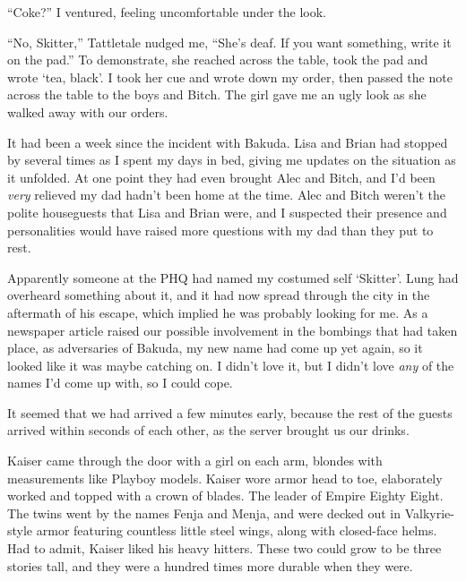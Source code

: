 ``Coke?'' I ventured, feeling uncomfortable under the look.



``No, Skitter,'' Tattletale nudged me, ``She's deaf.  If you want something, write it on the pad.''  To demonstrate, she reached across the table, took the pad and wrote `tea, black'.  I took her cue and wrote down my order, then passed the note across the table to the boys and Bitch.  The girl gave me an ugly look as she walked away with our orders.



It had been a week since the incident with Bakuda.  Lisa and Brian had stopped by several times as I spent my days in bed, giving me updates on the situation as it unfolded.  At one point they had even brought Alec and Bitch, and I'd been \emph{very} relieved my dad hadn't been home at the time.  Alec and Bitch weren't the polite houseguests that Lisa and Brian were, and I suspected their presence and personalities would have raised more questions with my dad than they put to rest.



Apparently someone at the PHQ had named my costumed self `Skitter'.  Lung had overheard something about it, and it had now spread through the city in the aftermath of his escape, which implied he was probably looking for me.  As a newspaper article raised our possible involvement in the bombings that had taken place, as adversaries of Bakuda, my new name had come up yet again, so it looked like it was maybe catching on.  I didn't love it, but I didn't love \emph{any }of the names I'd come up with, so I could cope.



It seemed that we had arrived a few minutes early, because the rest of the guests arrived within seconds of each other, as the server brought us our drinks.



Kaiser came through the door with a girl on each arm, blondes with measurements like Playboy models.  Kaiser wore armor head to toe, elaborately worked and topped with a crown of blades.  The leader of Empire Eighty Eight.  The twins went by the names Fenja and Menja, and were decked out in Valkyrie-style armor featuring countless little steel wings, along with closed-face helms.  Had to admit, Kaiser liked his heavy hitters.  These two could grow to be three stories tall, and they were a hundred times more durable when they were.



